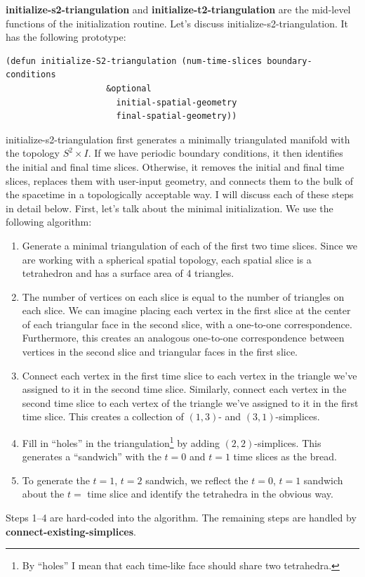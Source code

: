 \message{ !name(programmers_guide.tex)}\documentclass[12pt]{article}
\begin{document}
\textbf{initialize-s2-triangulation} and
\textbf{initialize-t2-triangulation} are the mid-level functions of
the initialization routine. Let's discuss
initialize-s2-triangulation. It has the following prototype:
\begin{small}
\begin{lstlisting}
(defun initialize-S2-triangulation (num-time-slices boundary-conditions 
				    &optional 
				      initial-spatial-geometry
				      final-spatial-geometry))
\end{lstlisting}
\end{small}
initialize-s2-triangulation first generates a minimally triangulated
manifold with the topology $S^2\times I$. If we have periodic boundary
conditions, it then identifies the initial and final time
slices. Otherwise, it removes the initial and final time slices,
replaces them with user-input geometry, and connects them to the bulk
of the spacetime in a topologically acceptable way. I will discuss
each of these steps in detail below. First, let's talk about the
minimal initialization. We use the following algorithm:
\begin{enumerate}
\item Generate a minimal triangulation of each of the first two time
  slices. Since we are working with a spherical spatial topology, each
  spatial slice is a tetrahedron and has a surface area of 4
  triangles.
\item The number of vertices on each slice is equal to the number of
  triangles on each slice. We can imagine placing each vertex in the
  first slice at the center of each triangular face in the second
  slice, with a one-to-one correspondence. Furthermore, this creates
  an analogous one-to-one correspondence between vertices in the
  second slice and triangular faces in the first slice.
\item Connect each vertex in the first time slice to each vertex in
  the triangle we've assigned to it in the second time
  slice. Similarly, connect each vertex in the second time slice to
  each vertex of the triangle we've assigned to it in the first time
  slice. This creates a collection of $(1,3)$- and $(3,1)$-simplices.
\item Fill in ``holes'' in the triangulation\footnote{By ``holes'' I
    mean that each time-like face should share two tetrahedra.} by
  adding $(2,2)$-simplices. This generates a ``sandwich'' with the
  $t=0$ and $t=1$ time slices as the bread.
\item To generate the $t=1$, $t=2$ sandwich, we reflect the $t=0$,
  $t=1$ sandwich about the $t=$ time slice and identify the tetrahedra
  in the obvious way.
\end{enumerate}
Steps 1--4 are hard-coded into the algorithm. The remaining steps are
handled by \textbf{connect-existing-simplices}.
\end{document}
